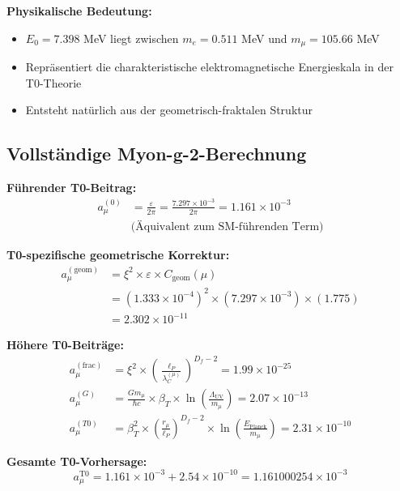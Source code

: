 \documentclass[12pt,a4paper]{article}
\numberwithin{equation}{section}
\newcommand{\xipar}{\xi}
\newcommand{\epsilonT}{\varepsilon}
\newcommand{\Cgeom}{C_{\text{geom}}}
\newcommand{\Df}{D_f}
\newcommand{\Eo}{E_0}
\newcommand{\lP}{\ell_P}
\newcommand{\lambdaC}{\lambda_C}
\begin{document}
	\textbf{Physikalische Bedeutung:}
	\begin{itemize}
		\item $\Eo = 7.398$ MeV liegt zwischen $m_e = 0.511$ MeV und $m_\mu = 105.66$ MeV
		\item Repräsentiert die charakteristische elektromagnetische Energieskala in der T0-Theorie
		\item Entsteht natürlich aus der geometrisch-fraktalen Struktur
	\end{itemize}
	
	\subsection{Vollständige Myon-g-2-Berechnung}
	
	\textbf{Führender T0-Beitrag:}
	\begin{align}
		a_\mu^{(0)} &= \frac{\epsilonT}{2\pi} = \frac{7.297 \times 10^{-3}}{2\pi} = 1.161 \times 10^{-3}\\
		&\text{(Äquivalent zum SM-führenden Term)}
		\label{eq:muon_leading}
	\end{align}
	
	\textbf{T0-spezifische geometrische Korrektur:}
	\begin{align}
		a_\mu^{(\text{geom})} &= \xipar^2 \times \epsilonT \times \Cgeom(\mu)\\
		&= (1.333 \times 10^{-4})^2 \times (7.297 \times 10^{-3}) \times (1.775)\\
		&= 2.302 \times 10^{-11}
		\label{eq:muon_geometric}
	\end{align}
	
	\textbf{Höhere T0-Beiträge:}
	\begin{align}
		a_\mu^{(\text{frac})} &= \xipar^2 \times \left(\frac{\lP}{\lambdaC^{(\mu)}}\right)^{\Df-2} = 1.99 \times 10^{-25}\\
		a_\mu^{(G)} &= \frac{G m_\mu}{\hbar c} \times \beta_T \times \ln\left(\frac{\Lambda_{\text{UV}}}{m_\mu}\right) = 2.07 \times 10^{-13}\\
		a_\mu^{(T0)} &= \beta_T^2 \times \left(\frac{r_\mu}{\lP}\right)^{\Df-2} \times \ln\left(\frac{E_{\text{Planck}}}{m_\mu}\right) = 2.31 \times 10^{-10}
		\label{eq:muon_higher_order}
	\end{align}
	
	\textbf{Gesamte T0-Vorhersage:}
	\begin{equation}
		a_\mu^{\text{T0}} = 1.161 \times 10^{-3} + 2.54 \times 10^{-10} = 1.161000254 \times 10^{-3}
		\label{eq:muon_total_final}
	\end{equation}
	
\end{document}
